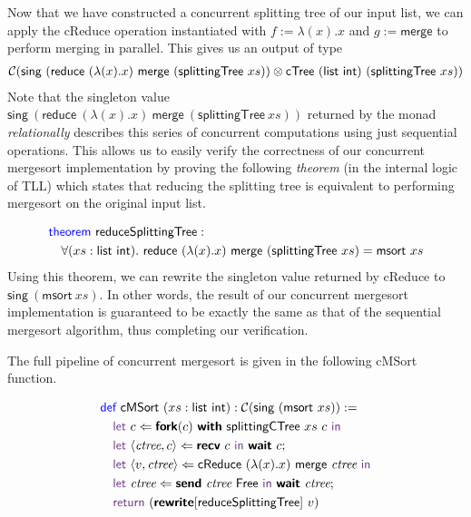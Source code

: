 Now that we have constructed a concurrent splitting tree of our input list, we can
apply the \textsf{cReduce} operation instantiated with $f := \lambda(x). x$
and $g := \textsf{merge}$ to perform merging in parallel.
This gives us an output of type
\begin{align*}
  \CM{\textsf{sing}\ (\textsf{reduce}\ (\lambda(x). x)\ \textsf{merge}\ (\textsf{splittingTree}\ xs)) \otimes \textsf{cTree}\ (\textsf{list}\ \textsf{int})\ (\textsf{splittingTree}\ xs)} 
\end{align*}
Note that the singleton value 
$\textsf{sing}\ (\textsf{reduce}\ (\lambda(x). x)\ \textsf{merge}\ (\textsf{splittingTree}\ xs))$
returned by the monad \emph{relationally} describes this series of concurrent computations using just 
sequential operations. This allows us to easily verify the correctness of our concurrent mergesort
implementation by proving the following \emph{theorem} (in the internal logic of TLL) which states that 
reducing the splitting tree is equivalent to performing mergesort on the original input list.

\vspace{-1em}
\begingroup
\small
\addtolength{\jot}{-0.2em}
\begin{align*}
  &\Theorem\ \textsf{reduceSplittingTree} : \\
  &\quad\forall (xs : \textsf{list}\ \textsf{int}).\ \textsf{reduce}\ (\lambda(x). x)\ \textsf{merge}\ (\textsf{splittingTree}\ xs) = \textsf{msort}\ xs
\end{align*}
\endgroup
Using this theorem, we can rewrite the singleton value returned by \textsf{cReduce} to
$\textsf{sing}\ (\textsf{msort}\ xs)$. In other words, the result of our concurrent
mergesort implementation is guaranteed to be exactly the same as that of the sequential
mergesort algorithm, thus completing our verification.

The full pipeline of concurrent mergesort is given in the following \textsf{cMSort} function.

\vspace{-1em}
\begingroup
\small
\addtolength{\jot}{-0.2em}
\begin{align*}
  &\Def\ \textsf{cMSort}\ (xs : \textsf{list}\ \textsf{int}) : \CM{\textsf{sing}\ (\textsf{msort}\ xs)} := \\
  &\quad\Let\ c \Leftarrow \Fork(c)\ \With\ \textsf{splittingCTree}\ xs\ c\ \In \\ 
  &\quad\Let\ \langle{\textit{ctree}, c}\rangle \Leftarrow \Recv\ c\ \In\ \Wait\ c; \\
  &\quad\Let\ \langle{v, \textit{ctree}}\rangle \Leftarrow \textsf{cReduce}\ (\lambda(x). x)\ \textsf{merge}\ \textit{ctree}\ \In \\
  &\quad\Let\ \textit{ctree} \Leftarrow \Send\ \textit{ctree}\ \textsf{Free}\ \In\ \Wait\ \textit{ctree}; \\
  &\quad\Return\ (\Rewrite[\textsf{reduceSplittingTree}]\ v)
\end{align*}
\endgroup

